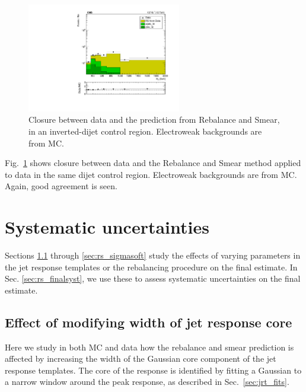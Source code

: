\begin{figure}[htp!]
  \begin{center}
    \includegraphics[width=0.60\textwidth]{figs/qcd/rs_data/monojet/dataAll_crRSInvertDPhibaseJ_htbins.pdf}
    \caption{Closure between data and the prediction from Rebalance and Smear, in an inverted-\dpmin dijet
control region. Electroweak backgrounds are from MC.
            }
    \label{Fig:rs_monojet_data_validation}
  \end{center}
\end{figure}

Fig.~\ref{Fig:rs_monojet_data_validation} shows closure between data and the Rebalance and Smear method applied to data
in the same dijet control region. Electroweak backgrounds are from MC. Again, good agreement is seen.

\section{Systematic uncertainties}
\label{sec:rs_systematics}

Sections \ref{sec:rs_jrt_core} through \ref{sec:rs_sigmasoft} study the effects of varying
parameters in the jet response templates or the rebalancing procedure on the final estimate.
In Sec. \ref{sec:rs_finalsyst}, we use these to assess systematic uncertainties on the final estimate.

\subsection{Effect of modifying width of jet response core}
\label{sec:rs_jrt_core}

Here we study in both MC and data how the rebalance and smear prediction is affected by increasing the width of the Gaussian core component of the jet response templates. 
The core of the response is identified by fitting a Gaussian to a narrow window around the peak response, as described in Sec.~\ref{sec:jrt_fits}.

